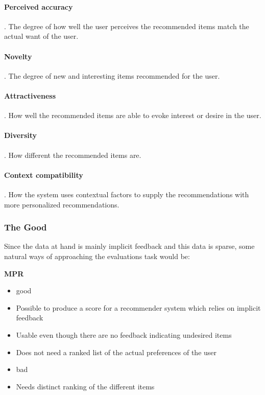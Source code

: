 
\paragraph{Perceived accuracy}.
The degree of how well the user perceives the recommended items match the actual want of the user.

\paragraph{Novelty}.
The degree of new and interesting items recommended for the user.

\paragraph{Attractiveness}.
How well the recommended items are able to evoke interest or desire in the user.

\paragraph{Diversity}.
How different the recommended items are.

\paragraph{Context compatibility}.
How the system uses contextual factors to supply the recommendations with more personalized recommendations.



\subsubsection{The Good}
Since the data at hand is mainly implicit feedback and this data is sparse, some natural ways of approaching the evaluations task would be:

\textbf{MPR}
\begin{itemize}
	\item good
	\item Possible to produce a score for a recommender system which relies on implicit feedback
	\item Usable even though there are no feedback indicating undesired items
	\item Does not need a ranked list of the actual preferences of the user
	\item bad
	\item Needs distinct ranking of the different items
\end{itemize}


